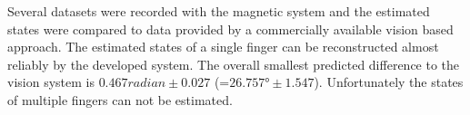 Several datasets were recorded with the magnetic system and the estimated states were compared to data provided by a commercially available vision based approach. The estimated states of a single finger can be reconstructed almost reliably by the developed system. The overall smallest predicted difference to the vision system is $ 0.467 \si{radian} \pm 0.027 $ (=$ 26.757 \si{\degree} \pm 1.547 $). Unfortunately the states of multiple fingers can not be estimated.





